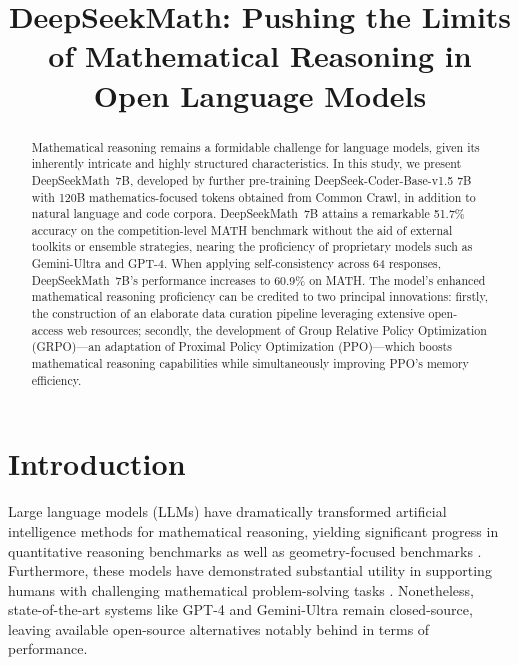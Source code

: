 \title{DeepSeekMath: Pushing the Limits of Mathematical Reasoning in Open Language Models}

\begin{abstract}
Mathematical reasoning remains a formidable challenge for language models, given its inherently intricate and highly structured characteristics. In this study, we present DeepSeekMath~7B, developed by further pre-training DeepSeek-Coder-Base-v1.5 7B with 120B mathematics-focused tokens obtained from Common Crawl, in addition to natural language and code corpora. DeepSeekMath~7B attains a remarkable 51.7\% accuracy on the competition-level MATH benchmark without the aid of external toolkits or ensemble strategies, nearing the proficiency of proprietary models such as Gemini-Ultra and GPT-4. When applying self-consistency across 64 responses, DeepSeekMath~7B’s performance increases to 60.9\% on MATH. The model's enhanced mathematical reasoning proficiency can be credited to two principal innovations: firstly, the construction of an elaborate data curation pipeline leveraging extensive open-access web resources; secondly, the development of Group Relative Policy Optimization (GRPO)—an adaptation of Proximal Policy Optimization (PPO)—which boosts mathematical reasoning capabilities while simultaneously improving PPO's memory efficiency.
\end{abstract}

\section{Introduction}

Large language models (LLMs) have dramatically transformed artificial intelligence methods for mathematical reasoning, yielding significant progress in quantitative reasoning benchmarks \citep{MATH} as well as geometry-focused benchmarks \citep{trinh2024solving}. Furthermore, these models have demonstrated substantial utility in supporting humans with challenging mathematical problem-solving tasks \citep{tao}. Nonetheless, state-of-the-art systems like GPT-4 \citep{gpt4} and Gemini-Ultra \citep{gemini} remain closed-source, leaving available open-source alternatives notably behind in terms of performance.

